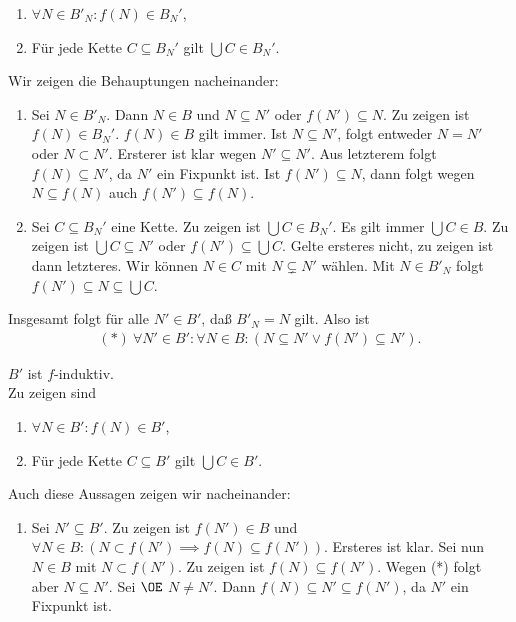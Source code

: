 \documentclass[../../main.tex]{subfiles}
\begin{document}
\begin{cproof}
\begin{tcolorbox}[arc=0mm, boxrule=0.2mm]
\begin{enumerate}[\normalfont(b)]
				\item $\forall N\in B'_N: f(N)\in B_N'$,
				\item Für jede Kette $C\subseteq B_N'$ gilt $\bigcup C\in B_N'$.
			\end{enumerate}
			Wir zeigen die Behauptungen nacheinander:
			\begin{enumerate}[\normalfont(b)]
				\item Sei $N\in B'_N$. Dann $N\in B$ und $N\subseteq N'$ oder $f(N')\subseteq N$. Zu zeigen ist $f(N)\in B_N'$. $f(N)\in B$ gilt immer. Ist $N\subseteq N'$, folgt entweder $N=N'$ oder $N\subset N'$. Ersterer ist klar wegen $N'\subseteq N'$. Aus letzterem folgt $f(N)\subseteq N'$, da $N'$ ein Fixpunkt ist. Ist $f(N')\subseteq N$, dann folgt wegen $N\subseteq f(N)$ auch $f(N')\subseteq f(N)$.
				\item Sei $C\subseteq B_N'$ eine Kette. Zu zeigen ist $\bigcup C\in B_N'$. Es gilt immer $\bigcup C\in B$. Zu zeigen ist $\bigcup C\subseteq N'$ oder $f(N')\subseteq \bigcup C$. Gelte ersteres nicht, zu zeigen ist dann letzteres. Wir können $N\in C$ mit $N\subsetneq N'$ wählen. Mit $N\in B'_N$ folgt $f(N')\subseteq N\subseteq \bigcup C$.
			\end{enumerate}
	\end{tcolorbox}
	Insgesamt folgt für alle $N'\in B'$, daß $B'_N=N$ gilt. Also ist
	\begin{align*}
		(*)\ \forall N'\in B': \forall N\in B: (N\subseteq N'\lor f(N')\subseteq N').
	\end{align*}
	\begin{tcolorbox}[arc=0mm, boxrule=0.2mm]
			$B'$ ist $f$-induktiv. \\
			Zu zeigen sind 
			\begin{enumerate}[\normalfont(a)]
				\item $\forall N\in B': f(N)\in B'$,
				\item Für jede Kette $C\subseteq B'$ gilt $\bigcup C\in B'$.
			\end{enumerate}
			Auch diese Aussagen zeigen wir nacheinander:
			\begin{enumerate}[\normalfont(a)]
				\item Sei $N'\subseteq B'$. Zu zeigen ist $f(N')\in B$ und $\forall N\in B: (N\subset f(N')\implies f(N)\subseteq f(N'))$. Ersteres ist klar. Sei nun $N\in B$ mit $N\subset f(N')$. Zu zeigen ist $f(N)\subseteq f(N')$. Wegen (*) folgt aber $N\subseteq N'$. Sei $\OE$ $N\neq N'$. Dann $f(N)\subseteq N'\subseteq f(N')$, da $N'$ ein Fixpunkt ist.

\end{enumerate}
\end{tcolorbox}
\end{cproof}
\end{document}

